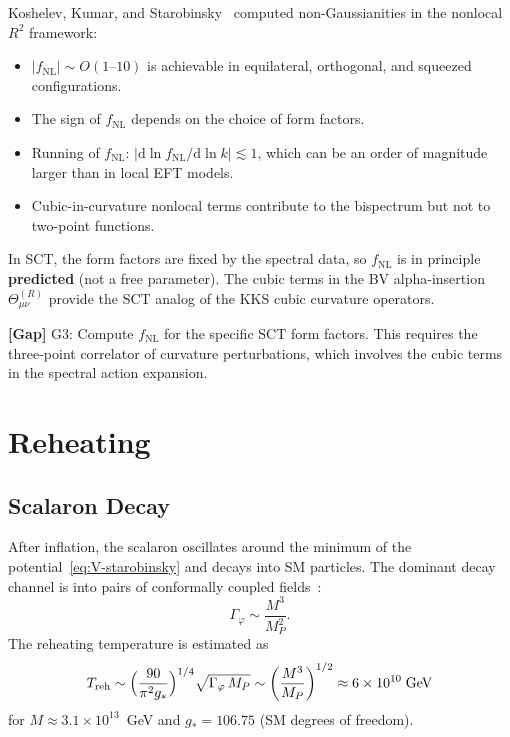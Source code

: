 \documentclass[11pt,a4paper]{article}
\renewcommand{\dd}{\mathrm{d}}
\theoremstyle{plain}
\theoremstyle{definition}
\newcommand{\gap}[1]{%
  \par\smallskip\noindent
  \colorbox{yellow!15}{\parbox{\dimexpr\linewidth-2\fboxsep}{%
    \textcolor{orange!70!black}{\textbf{[Gap]}} #1}}%
  \par\smallskip}
\begin{document}
Koshelev, Kumar, and Starobinsky~\cite{KKS20,KKS22b} computed
non-Gaussianities in the nonlocal $R^2$ framework:
\begin{itemize}[nosep]
  \item $|f_{\mathrm{NL}}| \sim O(1\text{--}10)$ is achievable in
    equilateral, orthogonal, and squeezed configurations.
  \item The sign of $f_{\mathrm{NL}}$ depends on the choice of form
    factors.
  \item Running of $f_{\mathrm{NL}}$:
    $|\dd \ln f_{\mathrm{NL}}/\dd \ln k| \lesssim 1$, which can be an
    order of magnitude larger than in local EFT models.
  \item Cubic-in-curvature nonlocal terms contribute to
    the bispectrum but not to two-point functions.
\end{itemize}

In SCT, the form factors are fixed by the spectral data, so
$f_{\mathrm{NL}}$ is in principle \textbf{predicted} (not a free
parameter). The cubic terms in the BV alpha-insertion
$\Theta^{(R)}_{\mu\nu}$ provide the SCT analog of the KKS cubic
curvature operators.

\gap{G3: Compute $f_{\mathrm{NL}}$ for the specific SCT form factors.
This requires the three-point correlator of curvature perturbations,
which involves the cubic terms in the spectral action expansion.}

\section{Reheating}\label{sec:reheating}

\subsection{Scalaron Decay}

After inflation, the scalaron oscillates around the minimum of the
potential~\eqref{eq:V-starobinsky} and decays into SM particles. The
dominant decay channel is into pairs of conformally coupled
fields~\cite{Star83,Vilenkin85}:
\begin{equation}\label{eq:decay-rate}
  \Gamma_\varphi \sim \frac{M^3}{M_P^2}.
\end{equation}
The reheating temperature is estimated as
\begin{equation}\label{eq:Treh}
  T_{\mathrm{reh}} \sim \Bigl(\frac{90}{\pi^2 g_*}\Bigr)^{1/4}
  \sqrt{\Gamma_\varphi\,M_P}
  \sim \left(\frac{M^3}{M_P}\right)^{1/2}
  \approx 6 \times 10^{10}\;\text{GeV}
\end{equation}
for $M \approx 3.1 \times 10^{13}$~GeV and
$g_* = 106.75$ (SM degrees of freedom).
\end{document}
